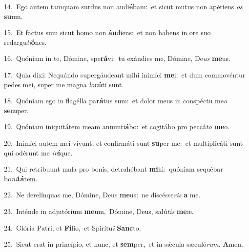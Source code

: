 {\numbfont\textcolor{\numbcolor}{14.}}~Ego autem tamquam surdus non audi\-\textbf{é}\-bam:~\star et sicut mutus non apériens \textit{os} \textbf{su}\-um.\par
{\numbfont\textcolor{\numbcolor}{15.}}~Et factus sum sicut homo non \textbf{áu}\-diens:~\star et non habens in ore suo redargu\-\textit{ti}\-\textbf{ó}nes.\par
{\numbfont\textcolor{\numbcolor}{16.}}~Quóniam in te, Dómine, spe\-\textbf{rá}\-vi:~\star tu exáudies me, Dómine, De\textit{us} \textbf{me}\-us.\par
{\numbfont\textcolor{\numbcolor}{17.}}~Quia dixi: Nequándo supergáudeant mihi inimíci \textbf{me}\-i:~\star et dum commovéntur pedes mei, super me magna \textit{lo}\-\textbf{cú}ti sunt.\par
{\numbfont\textcolor{\numbcolor}{18.}}~Quóniam ego in flagélla pa\-\textbf{rá}\-tus sum:~\star et dolor meus in conspéctu me\textit{o} \textbf{sem}\-per.\par
{\numbfont\textcolor{\numbcolor}{19.}}~Quóniam iniquitátem meam annunti\-\textbf{á}\-bo:~\star et cogitábo pro peccá\textit{to} \textbf{me}\-o.\par
{\numbfont\textcolor{\numbcolor}{20.}}~Inimíci autem mei vivunt, et confirmáti sunt \textbf{su}\-per me:~\star et multiplicáti sunt qui odérunt me \textit{in}\-\textbf{í}que.\par
{\numbfont\textcolor{\numbcolor}{21.}}~Qui retríbuunt mala pro bonis, detrahébant \textbf{mi}\-hi:~\star quóniam sequébar bo\-\textit{ni}\-\textbf{tá}tem.\par
{\numbfont\textcolor{\numbcolor}{22.}}~Ne derelínquas me, Dómine, Deus \textbf{me}\-us:~\star ne discésse\textit{ris} \textbf{a} me.\par
{\numbfont\textcolor{\numbcolor}{23.}}~Inténde in adjutórium \textbf{me}\-um,~\star Dómine, Deus, salú\textit{tis} \textbf{me}\-æ.\par
{\numbfont\textcolor{\numbcolor}{24.}}~Glória Patri, et \textbf{Fí}\-lio,~\star et Spirítu\textit{i} \textbf{Sanc}\-to.\par
{\numbfont\textcolor{\numbcolor}{25.}}~Sicut erat in princípio, et nunc, et \textbf{sem}\-per,~\star et in sǽcula sæculó\-\textit{rum}\-. \textbf{A}\-men.\par
